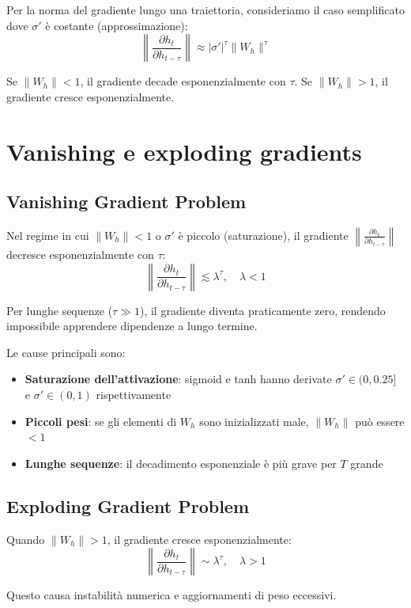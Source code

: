 Per la norma del gradiente lungo una traiettoria, consideriamo il caso semplificato dove $\sigma'$ è costante (approssimazione):
\[
\left\| \frac{\partial h_t}{\partial h_{t-\tau}} \right\| \approx |\sigma'|^\tau \|W_h\|^\tau
\]

Se $\|W_h\| < 1$, il gradiente decade esponenzialmente con $\tau$. Se $\|W_h\| > 1$, il gradiente cresce esponenzialmente.

\section{Vanishing e exploding gradients}

\subsection{Vanishing Gradient Problem}

\begin{definition}
Nel regime in cui $\|W_h\| < 1$ o $\sigma'$ è piccolo (saturazione), il gradiente $\left\| \frac{\partial h_t}{\partial h_{t-\tau}} \right\|$ decresce esponenzialmente con $\tau$:
\[
\left\| \frac{\partial h_t}{\partial h_{t-\tau}} \right\| \lesssim \lambda^\tau, \quad \lambda < 1
\]

Per lunghe sequenze ($\tau \gg 1$), il gradiente diventa praticamente zero, rendendo impossibile apprendere dipendenze a lungo termine.
\end{definition}

Le cause principali sono:
\begin{itemize}
\item \textbf{Saturazione dell'attivazione}: sigmoid e tanh hanno derivate $\sigma' \in (0, 0.25]$ e $\sigma' \in (0, 1)$ rispettivamente
\item \textbf{Piccoli pesi}: se gli elementi di $W_h$ sono inizializzati male, $\|W_h\|$ può essere $< 1$
\item \textbf{Lunghe sequenze}: il decadimento esponenziale è più grave per $T$ grande
\end{itemize}

\subsection{Exploding Gradient Problem}

\begin{definition}
Quando $\|W_h\| > 1$, il gradiente cresce esponenzialmente:
\[
\left\| \frac{\partial h_t}{\partial h_{t-\tau}} \right\| \sim \lambda^\tau, \quad \lambda > 1
\]

Questo causa instabilità numerica e aggiornamenti di peso eccessivi.
\end{definition}


